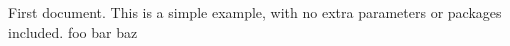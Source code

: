 \documentclass{article}
\begin{document}
First document. This is a simple example, with no 
extra parameters or packages included.
foo bar baz
\end{document}
